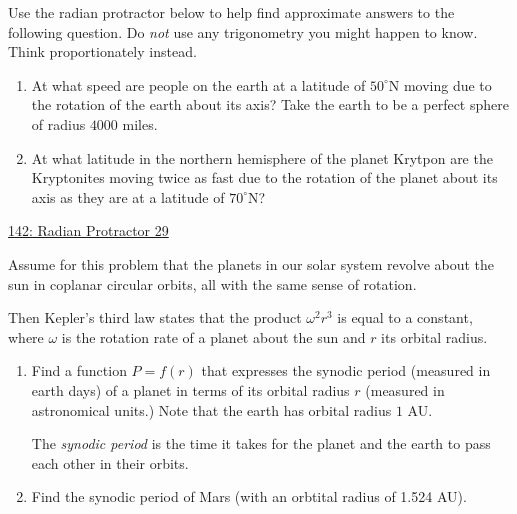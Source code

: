 \documentclass{ximera}
\begin{document}
\begin{question} \label{QLkfdktrtrgvb}
Use the radian protractor below to help find approximate answers to the following question. Do \emph{not} use any trigonometry you might happen to know. Think proportionately instead.

\begin{enumerate}
\item At what speed are people on the earth at a latitude of $50^\circ$N moving due to the rotation of the earth about its axis? Take the earth to be a perfect sphere of radius $4000$ miles.

\item At what latitude in the northern hemisphere of the planet Krytpon are the Kryptonites moving twice as fast due to the rotation of the planet about its axis as they are at a latitude of $70^\circ$N?

\end{enumerate}


\begin{onlineOnly}
\begin{center}
\end{center}
\end{onlineOnly}

\href{https://www.desmos.com/calculator/kjzez98bqn}{142: Radian Protractor 29}

\end{question}




\begin{question}  \label{QOFIGDIDeer3gg}
Assume for this problem that the planets in our solar system revolve about the sun in coplanar circular orbits, all with the same sense of rotation.

Then Kepler's third law states that the product $\omega^2 r^3$ is equal to a constant, where $\omega$ is the rotation rate of a planet about the sun and $r$ its orbital radius.

\begin{enumerate}
\item Find a function $P=f(r)$ that expresses the synodic period (measured in earth days) of a planet in terms of its orbital radius $r$ (measured in astronomical units.) Note that the earth has orbital radius $1$ AU.

The \emph{synodic period} is the time it takes for the planet and the earth to pass each other in their orbits.

\item Find the synodic period of Mars (with an orbtital radius of 1.524 AU).
\end{enumerate}

\end{question}
\end{document}
